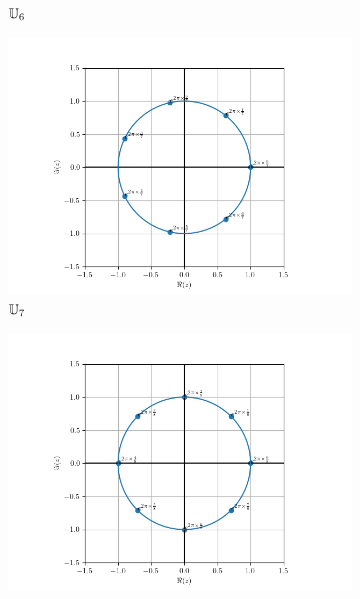 \begin{figure}
\begin{subfigure}{.3\textwidth}
                          \caption{$\mathbb{U}_6$}
                          \label{fig:U6}      
                        \end{subfigure}
                        \begin{subfigure}{.3\textwidth}
                          \centering
                          \includegraphics[scale = 0.33]{U_7.png}  
                          \caption{$\mathbb{U}_7$}
                          \label{fig:U7}
                        \end{subfigure}
                        \begin{subfigure}{.3\textwidth}
                          \centering
                          \includegraphics[scale = 0.33]{U_8.png}  

\end{subfigure}
\end{figure}
